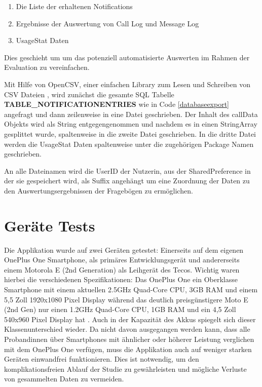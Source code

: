 \begin{enumerate}
  \item Die Liste der erhaltenen Notifications
  \item Ergebnisse der Auswertung von Call Log und Message Log
  \item UsageStat Daten
\end{enumerate}

Dies geschieht um um das potenziell automatisierte Auswerten im Rahmen der Evaluation zu vereinfachen.
\par

Mit Hilfe von OpenCSV, einer einfachen Library zum Lesen und Schreiben von CSV Dateien \cite{opencsv},
wird zunächst die gesamte SQL Tabelle \textbf{TABLE\_NOTIFICATIONENTRIES} wie in Code \ref{databaseexport} angefragt und dann zeilenweise in eine Datei geschrieben.
Der Inhalt des callData Objekts wird als String entgegengenommen und nachdem es in einen StringArray gesplittet wurde, spaltenweise in die zweite Datei geschrieben.
In die dritte Datei werden die UsageStat Daten spaltenweise unter die zugehörigen Package Namen geschrieben.
\par
An alle Dateinamen wird die UserID der Nutzerin, aus der SharedPreference in der sie gespeichert wird, als Suffix angehängt um eine Zuordnung der Daten zu den Auswertungsergebnissen der Fragebögen zu ermöglichen.


\section{Geräte Tests}

Die Applikation wurde auf zwei Geräten getestet:
Einerseits auf dem eigenen OnePlus One Smartphone, als primäres Entwicklungsgerät und andererseits einem Motorola E (2nd Generation) als Leihgerät des Tecos.
Wichtig waren hierbei die verschiedenen Spezifikationen:
Das OnePlus One ein Oberklasse Smartphone mit einem aktuellen 2.5GHz Quad-Core CPU, 3GB RAM und einem 5,5 Zoll 1920x1080 Pixel Display \cite{oneplusone}
während das deutlich preisgünstigere Moto E (2nd Gen) nur einen 1.2GHz Quad-Core CPU, 1GB RAM und ein 4,5 Zoll 540x960 Pixel Display hat \cite{motoe}.
Auch in der Kapazität des Akkus spiegelt sich dieser Klassenunterschied wieder.
Da nicht davon ausgegangen werden kann, dass alle Probandinnen über Smartphones mit ähnlicher oder höherer Leistung verglichen mit dem OnePlus One verfügen, muss die Applikation auch auf weniger starken Geräten einwandfrei funktionieren.
Dies ist notwendig, um den komplikationsfreien Ablauf der Studie zu gewährleisten und mögliche Verluste von gesammelten Daten zu vermeiden.
 

